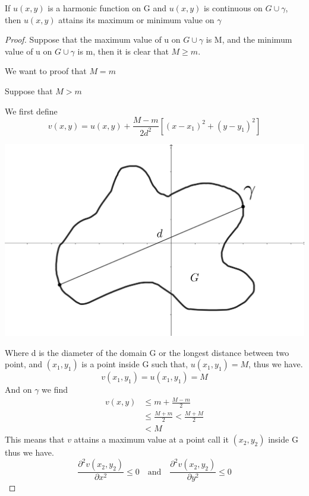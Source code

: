 \begin{theorem}
    If $u(x,y)$ is a harmonic function on G and $u(x,y)$ is continuous on $G \cup \gamma$, then $u(x,y)$ attains its maximum or minimum value on $\gamma$    
\end{theorem}
\begin{proof}[\textcolor{theme}{Proof}]
    Suppose that the maximum value of u on $G \cup \gamma$ is M, and the minimum value of u on $G \cup \gamma$ is m, then it is clear that $M \geq m$.
    \par
    We want to proof that $M = m$ 
    \par
    Suppose that $M > m$ 
    \par
    We first define
    \[
        v(x,y) = u(x,y) + \frac{M-m}{2d^2}\left[(x-x_{1})^2+(y-y_{1})^2\right]    
    \]
    \begin{center}
        \includegraphics[scale=0.1]{diameter.png}
    \end{center}
    Where d is the diameter of the domain G or the longest distance between two point, 
    and $(x_1,y_1)$ is a point inside G such that, $u(x_1,y_1) = M$, thus we have.
    \[
        v(x_1,y_1) = u(x_1,y_1) = M    
    \]
    And on $\gamma$ we find
    \begin{align*}
        v(x,y) &\leq m+\frac{M-m}{2}
        \\
        &\leq \frac{M+m}{2} < \frac{M+M}{2}
        \\
        &< M
    \end{align*}
    This means that $v$ attains a maximum value at a point call it $(x_2,y_2)$ inside G thus we have.
    \[
        \frac{\partial^2 v(x_2,y_2)}{\partial x^2} \leq 0 \quad \text{and} \quad \frac{\partial^2 v(x_2,y_2)}{\partial y^2} \leq 0    
\]
\end{proof}
